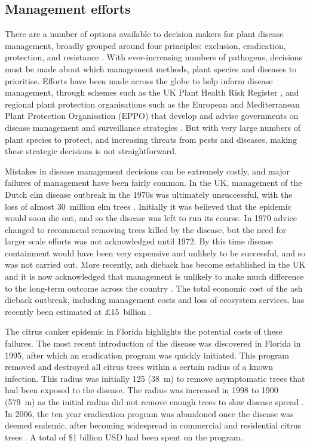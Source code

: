 \subsection{Management efforts}

There are a number of options available to decision makers for plant disease management, broadly grouped around four principles: exclusion, eradication, protection, and resistance \citep{maloy_plant_2005}. With ever-increasing numbers of pathogens, decisions must be made about which management methods, plant species and diseases to prioritise. Efforts have been made across the globe to help inform disease management, through schemes such as the UK Plant Health Risk Register \citep{baker_uk_2014}, and regional plant protection organisations such as the European and Mediterranean Plant Protection Organisation (EPPO) that develop and advise governments on disease management and surveillance strategies \citep{maloy_plant_2005}. But with very large numbers of plant species to protect, and increasing threats from pests and diseases, making these strategic decisions is not straightforward.

Mistakes in disease management decisions can be extremely costly, and major failures of management have been fairly common. In the UK, management of the Dutch elm disease outbreak in the 1970s was ultimately unsuccessful, with the loss of almost 30~million elm trees \citep{tomlinson_too_2010}. Initially it was believed that the epidemic would soon die out, and so the disease was left to run its course. In 1970 advice changed to recommend removing trees killed by the disease, but the need for larger scale efforts was not acknowledged until 1972. By this time disease containment would have been very expensive and unlikely to be successful, and so was not carried out. More recently, ash dieback has become established in the UK and it is now acknowledged that management is unlikely to make much difference to the long-term outcome across the country \citep{thomas_biological_2016}. The total economic cost of the ash dieback outbreak, including management costs and loss of ecosystem services, has recently been estimated at £15~billion \citep{hill_15_2019}.

The citrus canker epidemic in Florida highlights the potential costs of these failures. The most recent introduction of the disease was discovered in Florida in 1995, after which an eradication program was quickly initiated. This program removed and destroyed all citrus trees within a certain radius of a known infection. This radius was initially \SI{125}{\feet} (\SI{38}{\meter}) to remove asymptomatic trees that had been exposed to the disease. The radius was increased in 1998 to \SI{1900}{\feet} (\SI{579}{\meter}) as the initial radius did not remove enough trees to slow disease spread \citep{gottwald_citrus_2001}. In 2006, the ten year eradication program was abandoned once the disease was deemed endemic, after becoming widespread in commercial and residential citrus trees \citep{gottwald_citrus_2007}. A total of \$1 billion USD had been spent on the program.

